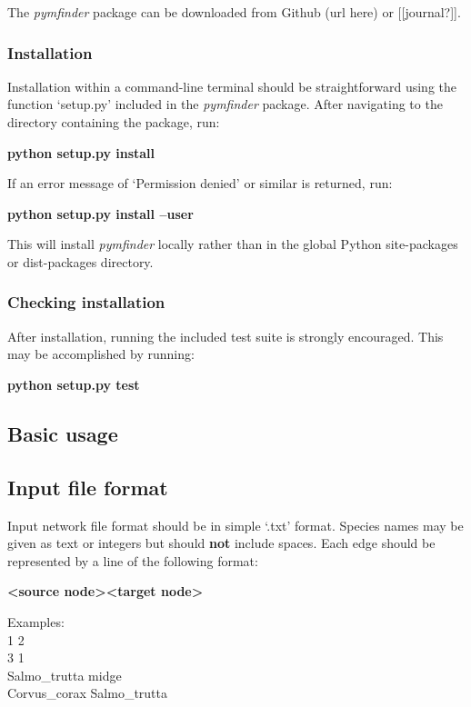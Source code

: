 \documentclass[12pt]{article}
\begin{document}
			The \emph{pymfinder} package can be downloaded from Github (url here) or [[journal?]].

		\subsubsection{Installation}

			Installation within a command-line terminal should be straightforward using the function `setup.py' included in the \emph{pymfinder} package. After navigating to the directory containing the package, run:

			\textbf{python setup.py install}

			If an error message of `Permission denied' or similar is returned, run:

			\textbf{python setup.py install --user}

			This will install \emph{pymfinder} locally rather than in the global Python site-packages or dist-packages directory. 


		\subsubsection{Checking installation}

			After installation, running the included test suite is strongly encouraged. This may be accomplished by running:

			\textbf{python setup.py test}


	\subsection{Basic usage}


		\subsection{Input file format}

			Input network file format should be in simple `.txt' format. Species names may be given as text or integers but should \textbf{not} include spaces. Each edge should be represented by a line of the following format:

			\textbf{\textless source node\textgreater  \textless target node\textgreater}

			Examples:\\
			1 2\\
			3 1\\
			Salmo\_trutta midge\\
			Corvus\_corax Salmo\_trutta\\
\end{document}
